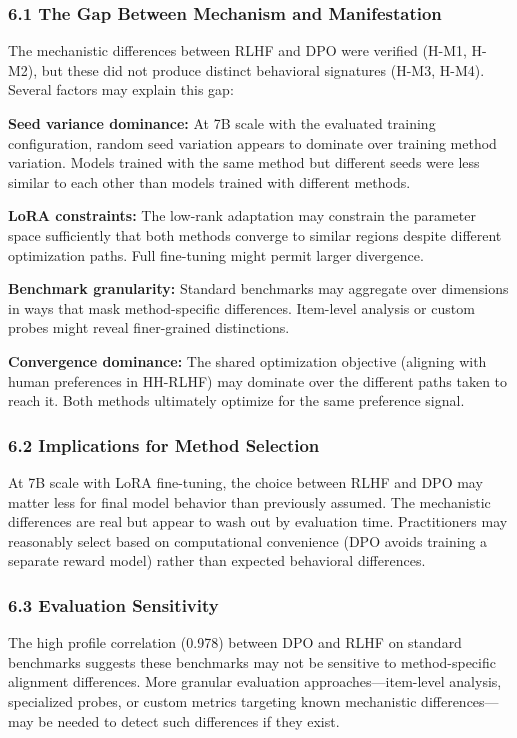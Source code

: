 
\subsubsection{6.1 The Gap Between Mechanism and Manifestation}

The mechanistic differences between RLHF and DPO were verified (H-M1, H-M2), but these did not produce distinct behavioral signatures (H-M3, H-M4). Several factors may explain this gap:

\textbf{Seed variance dominance:} At 7B scale with the evaluated training configuration, random seed variation appears to dominate over training method variation. Models trained with the same method but different seeds were less similar to each other than models trained with different methods.

\textbf{LoRA constraints:} The low-rank adaptation may constrain the parameter space sufficiently that both methods converge to similar regions despite different optimization paths. Full fine-tuning might permit larger divergence.

\textbf{Benchmark granularity:} Standard benchmarks may aggregate over dimensions in ways that mask method-specific differences. Item-level analysis or custom probes might reveal finer-grained distinctions.

\textbf{Convergence dominance:} The shared optimization objective (aligning with human preferences in HH-RLHF) may dominate over the different paths taken to reach it. Both methods ultimately optimize for the same preference signal.

\subsubsection{6.2 Implications for Method Selection}

At 7B scale with LoRA fine-tuning, the choice between RLHF and DPO may matter less for final model behavior than previously assumed. The mechanistic differences are real but appear to wash out by evaluation time. Practitioners may reasonably select based on computational convenience (DPO avoids training a separate reward model) rather than expected behavioral differences.

\subsubsection{6.3 Evaluation Sensitivity}

The high profile correlation (0.978) between DPO and RLHF on standard benchmarks suggests these benchmarks may not be sensitive to method-specific alignment differences. More granular evaluation approaches---item-level analysis, specialized probes, or custom metrics targeting known mechanistic differences---may be needed to detect such differences if they exist.

